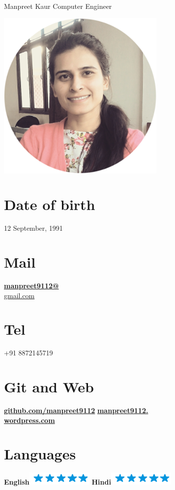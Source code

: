 \documentclass[]{friggeri-cv}
\begin{document}
\header{ } {Manpreet Kaur}
    {Computer Engineer}
      

\begin{aside}
\includegraphics[scale=0.30]{amar.png}
 \section{Date of birth}
  12 September, 1991
  \section{Mail}
    \href{mailto:manpreet9112@gmail.com}{\textbf{manpreet9112@}\\gmail.com}
  \section{Tel}
    +91 8872145719
  \section{Git and Web}
    \href{http://github.com/manpreet9112}{\textbf{github.com/manpreet9112}}
    \href{http://manpreet9112.wordpress.com}{\textbf{manpreet9112.\\wordpress.com}}
  \section{Languages}
     \textbf{English}\includegraphics[scale=0.40]{img/5stars.png}
      \textbf{Hindi}\includegraphics[scale=0.40]{img/5stars.png}

\end{aside}
\end{document}
